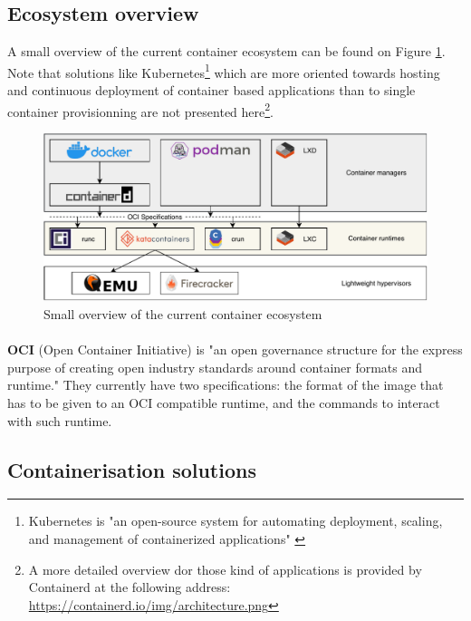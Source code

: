 \subsection{Ecosystem overview}
A small overview of the current container ecosystem can be found on Figure \ref{fig:overview}.  Note that solutions like Kubernetes\footnote{Kubernetes is "an open-source system for automating deployment, scaling, and management of containerized applications" \cite{kubernetes}} which are more oriented towards hosting and continuous deployment of container based applications than to single container provisionning are not presented here\footnote{A more detailed overview dor those kind of applications is provided by Containerd at the following address: \href{https://containerd.io/img/architecture.png}{https://containerd.io/img/architecture.png}}.
\begin{figure}[h!]
  \begin{center}
    \includegraphics[width=\linewidth]{images/ecosystem.pdf}
    \caption{Small overview of the current container ecosystem}
    \label{fig:overview}
  \end{center}
\end{figure}
\paragraph{}\textbf{OCI} (Open Container Initiative) is "an open governance structure for the express purpose of creating open industry standards around container formats and runtime."\cite{oci} They currently have two specifications: the format of the image that has to be given to an OCI compatible runtime, and the commands to interact with such runtime.

\subsection{Containerisation solutions}
